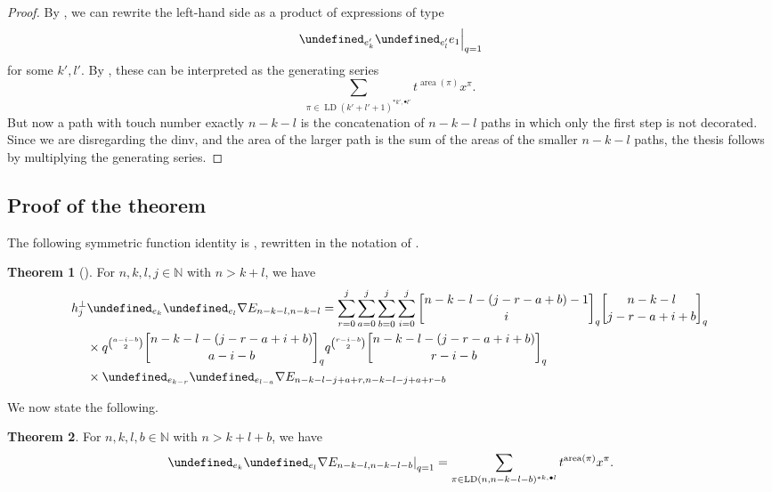\documentclass[reqno]{amsart}
\theoremstyle{plain}
\theoremstyle{definition}
\newtheorem{theorem}{Theorem}[section]
\theoremstyle{remark}
\DeclareMathOperator{\LD}{LD}
\DeclareMathOperator{\area}{area}
\let\oldTheta\Theta
\let\Theta\undefined
\DeclareMathOperator{\Theta}{\oldTheta}
\newcommand{\qbinom}[3][q]{\genfrac{[}{]}{0pt}{}{#2}{#3}_{#1}}
\newcommand{\<}{\langle}
\renewcommand{\>}{\rangle}
\begin{document}
\begin{proof}
    By , we can rewrite the left-hand side as a product of expressions of type
    \[ \left.\Theta_{e_k'} \Theta_{e_l'} e_1 \right|_{q=1} \]
    for some $k', l'$. By , these can be interpreted as the generating series
    \[ \sum_{\pi \in \LD(k'+l'+1)^{\ast k', \bullet l'}} t^{\area(\pi)} x^\pi. \]
    But now a path with touch number exactly $n-k-l$ is the concatenation of $n-k-l$ paths in which only the first step is not decorated. Since we are disregarding the dinv, and the area of the larger path is the sum of the areas of the smaller $n-k-l$ paths, the thesis follows by multiplying the generating series.
\end{proof}

\subsection{Proof of the theorem}

The following symmetric function identity is \cite[Theorem~8.2]{DAdderioRomero2023ThetaIdentities}, rewritten in the notation of \cite{IraciNadeauVandenWyngaerd2024Smirnov}.

\begin{theorem}[{\cite[Theorem~8.2]{DAdderioRomero2023ThetaIdentities}}]
    \label{thm:full_recursion}
    For $n,k,l,j \in \mathbb{N}$ with $n > k+l$, we have
    \begin{align*}
        h_j^\perp & \Theta_{e_k} \Theta_{e_l} \nabla E_{n-k-l, n-k-l} = \sum_{r=0}^{j} \sum_{a=0}^{j} \sum_{b=0}^{j} \sum_{i=0}^{j} \qbinom{n-k-l-(j-r-a+b)-1}{i} \qbinom{n-k-l}{j-r-a+i+b} \\
        & \times q^{\binom{a-i-b}{2}} \qbinom{n-k-l-(j-r-a+i+b)}{a-i-b}  q^{\binom{r-i-b}{2}} \qbinom{n-k-l-(j-r-a+i+b)}{r-i-b} \\
        & \times \Theta_{e_{k-r}} \Theta_{e_{l-a}} \nabla E_{n-k-l-j+a+r,n-k-l-j+a+r-b}
    \end{align*}
\end{theorem}

We now state the following.

\begin{theorem}
    \label{thm:combinatorial_recursion}
    For $n,k,l,b \in \mathbb{N}$ with $n > k+l+b$, we have
    \[ \left.\Theta_{e_k} \Theta_{e_l} \nabla E_{n-k-l, n-k-l-b} \right|_{q=1} = \sum_{\pi \in \LD(n, n-k-l-b)^{\ast k, \bullet l}} t^{\area(\pi)} x^\pi. \]  
\end{theorem}
\end{document}
